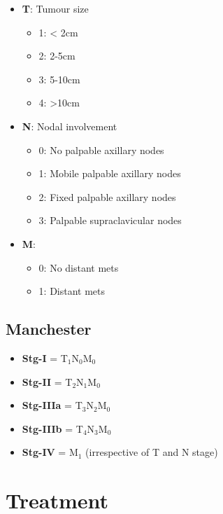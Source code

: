 \documentclass[
  12pt,
]{memoir}
\providecommand{\tightlist}{%
  \setlength{\itemsep}{0pt}\setlength{\parskip}{0pt}}
\begin{document}
\begin{itemize}
\tightlist
\item
  \textbf{T}: Tumour size

  \begin{itemize}
  \tightlist
  \item
    1: \textless{} 2cm
  \item
    2: 2-5cm
  \item
    3: 5-10cm
  \item
    4: \textgreater10cm
  \end{itemize}
\item
  \textbf{N}: Nodal involvement

  \begin{itemize}
  \tightlist
  \item
    0: No palpable axillary nodes
  \item
    1: Mobile palpable axillary nodes
  \item
    2: Fixed palpable axillary nodes
  \item
    3: Palpable supraclavicular nodes
  \end{itemize}
\item
  \textbf{M}:

  \begin{itemize}
  \tightlist
  \item
    0: No distant mets
  \item
    1: Distant mets
  \end{itemize}
\end{itemize}

\hypertarget{manchester}{%
\subsection{Manchester}\label{manchester}}

\begin{itemize}
\tightlist
\item
  \textbf{Stg-I} = T\(_1\)N\(_0\)M\(_0\)
\item
  \textbf{Stg-II} = T\(_2\)N\(_1\)M\(_0\)
\item
  \textbf{Stg-IIIa} = T\(_3\)N\(_2\)M\(_0\)
\item
  \textbf{Stg-IIIb} = T\(_4\)N\(_3\)M\(_0\)
\item
  \textbf{Stg-IV} = M\(_1\) (irrespective of T and N stage)
\end{itemize}

\hypertarget{treatment-2}{%
\section{Treatment}\label{treatment-2}}
\end{document}
